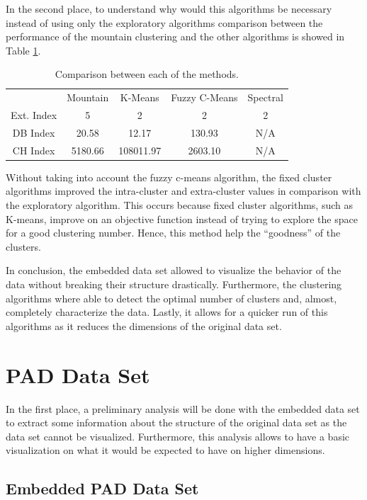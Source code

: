 \documentclass[conference]{IEEEtran}
\theoremstyle{definition}
\theoremstyle{remark}
\theoremstyle{remark}
\begin{document}
In the second place, to understand why would this algorithms be necessary
instead of using only the exploratory algorithms comparison between the
performance of the mountain clustering and the other algorithms is showed in
Table \ref{tab:compemb}.

\begin{table}
  \begin{tabular}{ccccc}
    \hline
    & Mountain & K-Means & Fuzzy C-Means & Spectral \\
    Ext. Index & 5       & 2         & 2            & 2                   \\
    DB Index   & 20.58   & 12.17     & 130.93       & N/A                 \\
    CH Index   & 5180.66 & 108011.97 & 2603.10      & N/A \\ \hline
  \end{tabular}
  \caption{Comparison between each of the methods.}
  \label{tab:compemb}
\end{table}

Without taking into account the fuzzy c-means algorithm, the fixed cluster
algorithms improved the intra-cluster and extra-cluster values in comparison
with the exploratory algorithm. This occurs because fixed cluster algorithms,
such as K-means, improve on an objective function instead of trying to explore
the space for a good clustering number. Hence, this method help the ``goodness''
of the clusters.

In conclusion, the embedded data set allowed to visualize the behavior of the
data without breaking their structure drastically. Furthermore, the clustering
algorithms where able to detect the optimal number of clusters and, almost,
completely characterize the data. Lastly, it allows for a quicker run of this
algorithms as it reduces the dimensions of the original data set.


\section{PAD Data Set}
In the first place, a preliminary analysis will be done with the embedded data
set to extract some information about the structure of the original data set as
the data set cannot be visualized. Furthermore, this analysis allows to have a
basic visualization on what it would be expected to have on higher dimensions.

\subsection{Embedded PAD Data Set}
\end{document}
